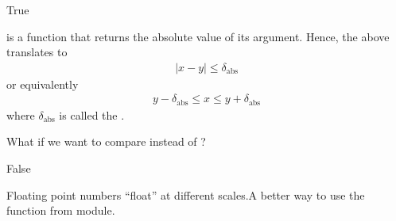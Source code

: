 \documentclass[letterpaper,10pt,english]{sphinxmanual}
\begin{document}
\begin{sphinxVerbatim}[commandchars=\\\{\}]
    
\end{sphinxVerbatim}

\begin{sphinxVerbatim}[commandchars=\\\{\}]
True
\end{sphinxVerbatim}

 is a function that returns the absolute value of its argument. Hence, the above translates to
\begin{equation*}
\begin{split}|x - y| \leq \delta_{\text{abs}}\end{split}
\end{equation*}
or equivalently
\begin{equation*}
\begin{split}y-\delta_{\text{abs}} \leq x \leq y+\delta_{\text{abs}} \end{split}
\end{equation*}
where \(\delta_{\text{abs}}\) is called the .


What if we want to compare  instead of ?

\begin{sphinxVerbatim}[commandchars=\\\{\}]
  
  
    
\end{sphinxVerbatim}

\begin{sphinxVerbatim}[commandchars=\\\{\}]
False
\end{sphinxVerbatim}

Floating point numbers “float” at different scales.A better way to use the  function from  module.
\end{document}
